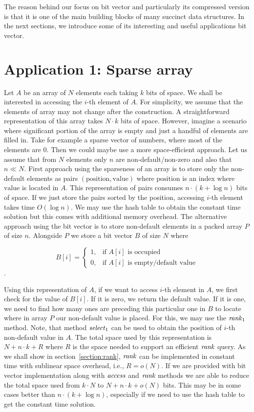 The reason behind our focus on bit vector and particularly its compressed version
is that it is one of the main building blocks of many succinct data structures.
In the next sections, we introduce some of its interesting and useful applications
bit vector.

\section{Application 1: Sparse array}

Let $A$ be an array of $N$ elements each taking $k$ bits of space. We shall be interested in
accessing the $i$-th element of $A$. For simplicity, we assume that the elements of array may
not change after the construction. A straightforward representation of this array takes $N\cdot k$
bits of space. However, imagine a scenario where significant portion of the array is empty
and just a handful of elements are filled in. Take for example a sparse vector of numbers,
where most of the elements are 0. Then we could maybe use a more space-efficient approach.
Let us assume that from $N$ elements only $n$ are non-default/non-zero and also that $n\ll N$.
First approach using the sparseness of an array is to store only the non-default elements as
pairs $(\text{position}, \text{value})$ where $\text{position}$ is an index where $\text{value}$
is located in $A$. This representation of pairs consumes $n\cdot (k+\log n)$ bits of space.
If we just store the pairs sorted by the position, accessing $i$-th element takes time $O(\log n)$.
We may use the hash table to obtain the constant time solution but this comes with additional
memory overhead. The alternative approach using the bit vector is to store non-default elements in
a packed array $P$ of size $n$. Alongside $P$ we store a bit vector $B$ of size $N$ where

\[
   B[i]=
\begin{cases}
   1,& \text{if $A[i]$ is occupied} \\
   0,& \text{if $A[i]$ is empty/default value}
\end{cases}
\].

Using this representation of $A$, if we want to access $i$-th element in $A$, we first check for
the value of $B[i]$. If it is zero, we return the default value. If it is one, we need to find
how many ones are preceding this particular one in $B$ to locate where in array $P$ our non-default
value is placed. For this, we may use the $\mathit{rank}_1$ method. Note, that method $\mathit{select}_1$ can
be used to obtain the position of $i$-th non-default value in $A$. The total space used by this
representation is $N+n\cdot k+R$ where $R$ is the space needed to support an efficient $\mathit{rank}$ query.
As we shall show in section~\ref{section:rank}, $\mathit{rank}$ can be implemented in constant time with
sublinear space overhead, i.e., $R = o(N)$. If we are provided with bit vector implementation along
with $\mathit{access}$ and $\mathit{rank}$ methods we are able to reduce the total space used from $k\cdot N$ to
$N+n\cdot k+o(N)$ bits. This may be in some cases better than $n\cdot (k+\log n)$, especially if
we need to use the hash table to get the constant time solution.


